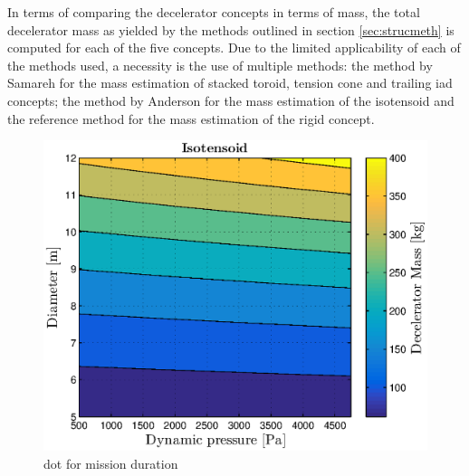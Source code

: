 In terms of comparing the decelerator concepts in terms of mass, the total decelerator mass as yielded by the methods outlined in section \ref{sec:strucmeth} is computed for each of the five concepts. Due to the limited applicability of each of the methods used, a necessity is the use of multiple methods: the method by Samareh \cite{Samareh2011} for the mass estimation of stacked toroid, tension cone and trailing \gls{iad} concepts; the method by Anderson \cite{Anderson1969} for the mass estimation of the isotensoid and the reference method for the mass estimation of the rigid concept. 

\begin{figure}[H]
\centering
\includegraphics[width = 1.0\textwidth]{Figure/ISO_comp.eps}
\caption{\acrlong{dot} for mission duration}
\label{fig:dotduration}
\end{figure}
